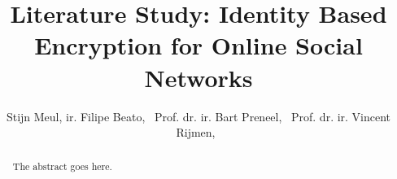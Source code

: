 \documentclass[journal]{IEEEtran}
\begin{document}
%
\title{Literature Study: Identity Based Encryption for Online Social Networks}
%
%
%

\author{Stijn Meul,
        ir. Filipe Beato,~
        Prof. dr. ir. Bart Preneel,~
        Prof. dr. ir. Vincent Rijmen,~%
        }

\markboth{}%
{}
% 

\maketitle

\begin{abstract}
The abstract goes here.
\end{abstract}







%
\IEEEpeerreviewmaketitle
\end{document}
